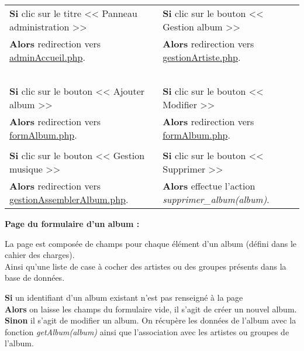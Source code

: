             \begin{center}
                \begin{tabular}{l | l}
                    \textbf{Si} clic sur le titre << Panneau administration >> & \textbf{Si} clic sur le bouton << Gestion album >> \\
                    \textbf{Alors} redirection vers \underline{adminAccueil.php}. & \textbf{Alors} redirection vers \underline{gestionArtiste.php}. \\ \\

                    \textbf{Si} clic sur le bouton << Ajouter album >> & \textbf{Si} clic sur le bouton << Modifier >> \\
                    \textbf{Alors} redirection vers \underline{formAlbum.php}. & \textbf{Alors} redirection vers \underline{formAlbum.php}. \\ \\
                    
                    \textbf{Si} clic sur le bouton << Gestion musique >> & \textbf{Si} clic sur le bouton << Supprimer >> \\
                    \textbf{Alors} redirection vers \underline{gestionAssemblerAlbum.php}. & \textbf{Alors} effectue l'action \emph{supprimer\_album(album)}.
                \end{tabular}
            \end{center}

        \clearpage
            
        
            \begin{paragraphe}
                \textbf{Page du formulaire d'un album :}
            \end{paragraphe}
            
            \begin{paragraphe}
                La page est composée de champs pour chaque élément d'un album (défini dans le cahier des charges). \\
                Ainsi qu'une liste de case à cocher des artistes ou des groupes présents dans la base de données.
            \end{paragraphe}

            \begin{paragraphe}
                \textbf{Si} un identifiant d'un album existant n'est pas renseigné à la page \\
                \textbf{Alors} on laisse les champs du formulaire vide, il s'agit de créer un nouvel album. \\
                \textbf{Sinon} il s'agit de modifier un album. On récupère les données de l'album avec la fonction \emph{getAlbum(album)} ainsi que l'association avec les artistes ou groupes de l'album.
            \end{paragraphe}
            
